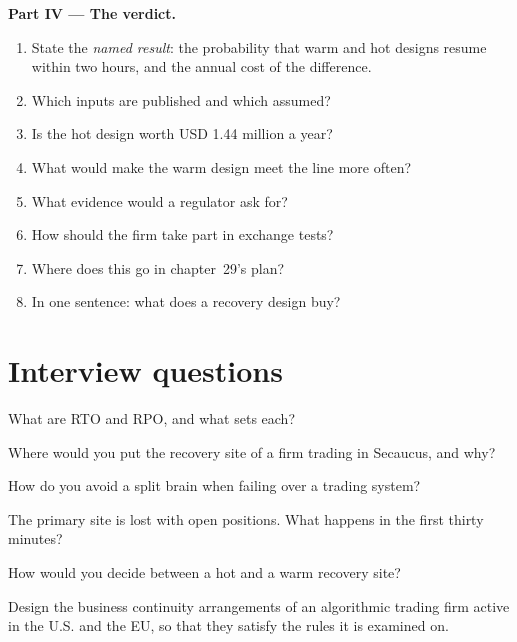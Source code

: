 \begin{problem}
\medskip\noindent\textbf{Part IV --- The verdict.}
\begin{enumerate}[resume]
\item State the \emph{named result}: the probability that warm and hot designs resume within two hours, and the annual cost of the
  difference.
\item Which inputs are published and which assumed?
\item Is the hot design worth USD 1.44 million a year?
\item What would make the warm design meet the line more often?
\item What evidence would a regulator ask for?
\item How should the firm take part in exchange tests?
\item Where does this go in chapter~29's plan?
\item In one sentence: what does a recovery design buy?
\end{enumerate}
\end{problem}

\section{Interview questions}

\begin{interviewq}\label{iq:nw:disaster-recovery-and-regulatory-requirements:1}
What are RTO and RPO, and what sets each?
\end{interviewq}

\begin{interviewq}\label{iq:nw:disaster-recovery-and-regulatory-requirements:2}
Where would you put the recovery site of a firm trading in Secaucus, and why?
\end{interviewq}

\begin{interviewq}\label{iq:nw:disaster-recovery-and-regulatory-requirements:3}
How do you avoid a split brain when failing over a trading system?
\end{interviewq}

\begin{interviewq}\label{iq:nw:disaster-recovery-and-regulatory-requirements:4}
The primary site is lost with open positions. What happens in the first thirty minutes?
\end{interviewq}

\begin{interviewq}\label{iq:nw:disaster-recovery-and-regulatory-requirements:5}
How would you decide between a hot and a warm recovery site?
\end{interviewq}

\begin{interviewq}\label{iq:nw:disaster-recovery-and-regulatory-requirements:6}
Design the business continuity arrangements of an algorithmic trading firm active in the U.S. and the EU, so that they satisfy the rules
it is examined on.
\end{interviewq}
